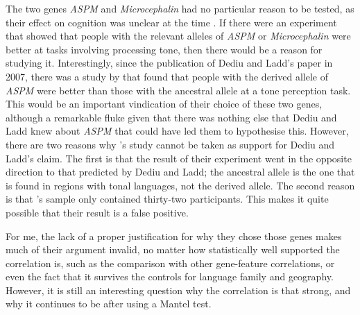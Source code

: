 \documentclass[output=paper]{langsci/langscibook}
\begin{document}
  The two genes \textit{ASPM }and \textit{Microcephalin} had no particular reason to be tested, as their effect on cognition was unclear at the time \citep{Dediu2007,Mekel-Bobrov2007}.  If there were an experiment that showed that people with the relevant alleles of \textit{ASPM} or \textit{Microcephalin} were better at tasks involving processing tone, then there would be a reason for studying it.  Interestingly, since the publication of Dediu and Ladd’s paper in 2007, there was a study by \citet{Wong2012} that found that people with the derived allele of \textit{ASPM} were better than those with the ancestral allele at a tone perception task.  This would be an important vindication of their choice of these two genes, although a remarkable fluke given that there was nothing else that Dediu and Ladd knew about \textit{ASPM }that could have led them to hypothesise this.  However, there are two reasons why \citeauthor{Wong2012}’s study cannot be taken as support for Dediu and Ladd’s claim.  The first is that the result of their experiment went in the opposite direction to that predicted by Dediu and Ladd; the ancestral allele is the one that is found in regions with tonal languages, not the derived allele.  The second reason is that \citeauthor{Wong2012}’s sample only contained thirty-two participants.  This makes it quite possible that their result is a false positive.      



For me, the lack of a proper justification for why they chose those genes makes much of their argument invalid, no matter how statistically well supported the correlation is, such as the comparison with other gene-feature correlations, or even the fact that it survives the controls for language family and geography.  However, it is still an interesting question why the correlation is that strong, and why it continues to be after using a Mantel test. 
\end{document}
